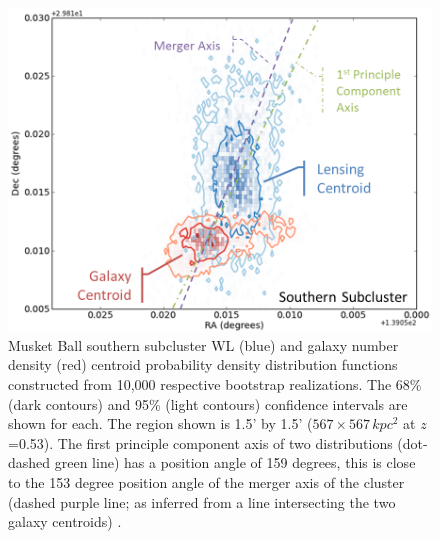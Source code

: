 \begin{figure}
\centering
\includegraphics[width=5in]{Chapter4/AnalysisFiles/southcentroids_histplot2d_reformat.png}
\caption[Musket Ball southern subcluster galaxy and weak lensing centroid spatial distribution.]{
Musket Ball southern subcluster WL (blue) and galaxy number density (red) centroid probability density distribution functions constructed from 10,000 respective bootstrap realizations.
The 68\% (dark contours) and 95\% (light contours) confidence intervals are shown for each.
The region shown is 1.5' by 1.5' ($567\times 567\,kpc^2$ at $z$=0.53).
The first principle component axis of two distributions (dot-dashed green line) has a position angle of 159 degrees, this is close to the 153 degree position angle of the merger axis of the cluster (dashed purple line; as inferred from a line intersecting the two galaxy centroids) .
}
\label{figure:CentroidDist_South}
\end{figure}

